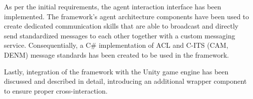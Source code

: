 \documentclass[main.tex]{subfiles}
\begin{document}
As per the initial requirements, the agent interaction interface has been implemented. The framework's agent 
architecture components have been used to create dedicated communication skills that are able to broadcast and 
directly send standardized messages to each other together with a custom messaging service.
Consequentially, a C\# implementation of ACL and C-ITS (CAM, DENM) message standards has been created to
be used in the framework. 

Lastly, integration of the framework with the Unity game engine has been discussed and described in detail, 
introducing an additional wrapper component to ensure proper cross-interaction.

\clearpage
\end{document}
